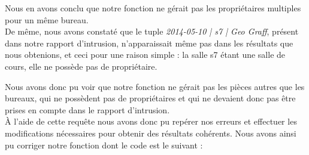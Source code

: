 Nous en avons conclu que notre fonction ne gérait pas les propriétaires multiples pour un même bureau.\\

De même, nous avons constaté que le tuple \textit{2014-05-10 | s7 | Geo Graff}, présent dans notre rapport d'intrusion, n'apparaissait même pas dans les résultats que nous obtenions, et ceci pour une raison simple : la salle s7 étant une salle de cours, elle ne possède pas de propriétaire.

Nous avons donc pu voir que notre fonction ne gérait pas les pièces autres que les bureaux, qui ne possèdent pas de propriétaires et qui ne devaient donc pas être prises en compte dans le rapport d'intrusion.\\

À l'aide de cette requête nous avons donc pu repérer nos erreurs et effectuer les modifications nécessaires pour obtenir des résultats cohérents. Nous avons ainsi pu corriger notre fonction  dont le code est le suivant :

\inputminted[tabsize=4,linenos,fontsize=\small]{sql}{code/3.sql}